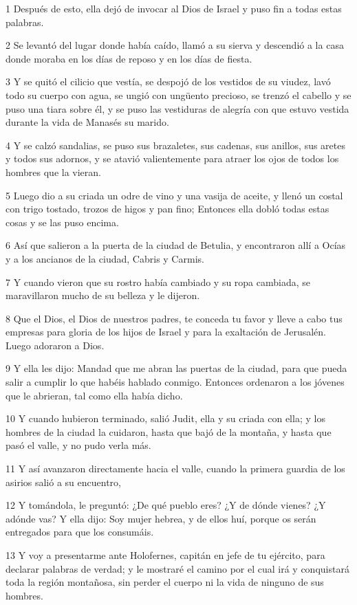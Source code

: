 \par 1 Después de esto, ella dejó de invocar al Dios de Israel y puso fin a todas estas palabras.
\par 2 Se levantó del lugar donde había caído, llamó a su sierva y descendió a la casa donde moraba en los días de reposo y en los días de fiesta.
\par 3 Y se quitó el cilicio que vestía, se despojó de los vestidos de su viudez, lavó todo su cuerpo con agua, se ungió con ungüento precioso, se trenzó el cabello y se puso una tiara sobre él, y se puso las vestiduras de alegría con que estuvo vestida durante la vida de Manasés su marido.
\par 4 Y se calzó sandalias, se puso sus brazaletes, sus cadenas, sus anillos, sus aretes y todos sus adornos, y se atavió valientemente para atraer los ojos de todos los hombres que la vieran.
\par 5 Luego dio a su criada un odre de vino y una vasija de aceite, y llenó un costal con trigo tostado, trozos de higos y pan fino; Entonces ella dobló todas estas cosas y se las puso encima.
\par 6 Así que salieron a la puerta de la ciudad de Betulia, y encontraron allí a Ocías y a los ancianos de la ciudad, Cabris y Carmis.
\par 7 Y cuando vieron que su rostro había cambiado y su ropa cambiada, se maravillaron mucho de su belleza y le dijeron.
\par 8 Que el Dios, el Dios de nuestros padres, te conceda tu favor y lleve a cabo tus empresas para gloria de los hijos de Israel y para la exaltación de Jerusalén. Luego adoraron a Dios.
\par 9 Y ella les dijo: Mandad que me abran las puertas de la ciudad, para que pueda salir a cumplir lo que habéis hablado conmigo. Entonces ordenaron a los jóvenes que le abrieran, tal como ella había dicho.
\par 10 Y cuando hubieron terminado, salió Judit, ella y su criada con ella; y los hombres de la ciudad la cuidaron, hasta que bajó de la montaña, y hasta que pasó el valle, y no pudo verla más.
\par 11 Y así avanzaron directamente hacia el valle, cuando la primera guardia de los asirios salió a su encuentro,
\par 12 Y tomándola, le preguntó: ¿De qué pueblo eres? ¿Y de dónde vienes? ¿Y adónde vas? Y ella dijo: Soy mujer hebrea, y de ellos huí, porque os serán entregados para que los consumáis.
\par 13 Y voy a presentarme ante Holofernes, capitán en jefe de tu ejército, para declarar palabras de verdad; y le mostraré el camino por el cual irá y conquistará toda la región montañosa, sin perder el cuerpo ni la vida de ninguno de sus hombres.
